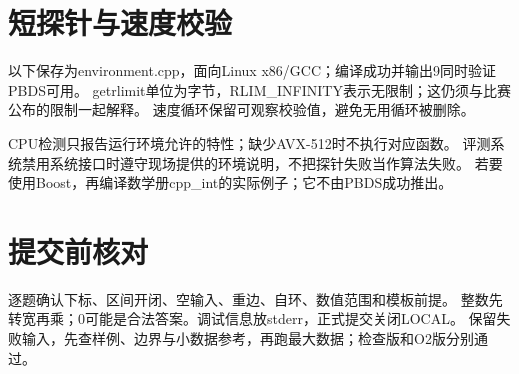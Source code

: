 \newpage
\section{短探针与速度校验}
以下保存为environment.cpp，面向Linux x86/GCC；编译成功并输出9同时验证PBDS可用。
getrlimit单位为字节，RLIM\_INFINITY表示无限制；这仍须与比赛公布的限制一起解释。
速度循环保留可观察校验值，避免无用循环被删除。

CPU检测只报告运行环境允许的特性；缺少AVX-512时不执行对应函数。
评测系统禁用系统接口时遵守现场提供的环境说明，不把探针失败当作算法失败。
若要使用Boost，再编译数学册cpp\_int的实际例子；它不由PBDS成功推出。

\section{提交前核对}
逐题确认下标、区间开闭、空输入、重边、自环、数值范围和模板前提。
整数先转宽再乘；0可能是合法答案。调试信息放stderr，正式提交关闭LOCAL。
保留失败输入，先查样例、边界与小数据参考，再跑最大数据；检查版和O2版分别通过。

\newpage
